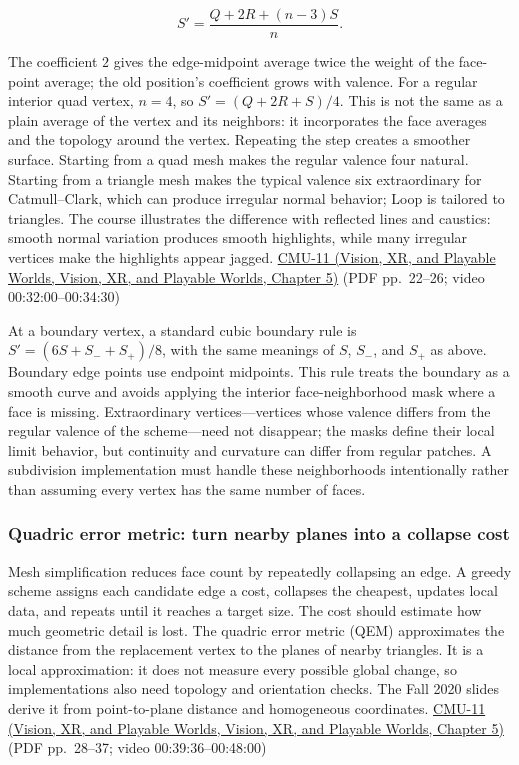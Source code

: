 \[
S'=\frac{Q+2R+(n-3)S}{n}.
\]

The coefficient \(2\) gives the edge-midpoint average twice the weight of the face-point average; the old position's coefficient grows with valence. For a regular interior quad vertex, \(n=4\), so \(S'=(Q+2R+S)/4\). This is not the same as a plain average of the vertex and its neighbors: it incorporates the face averages and the topology around the vertex. Repeating the step creates a smoother surface. Starting from a quad mesh makes the regular valence four natural. Starting from a triangle mesh makes the typical valence six extraordinary for Catmull--Clark, which can produce irregular normal behavior; Loop is tailored to triangles. The course illustrates the difference with reflected lines and caustics: smooth normal variation produces smooth highlights, while many irregular vertices make the highlights appear jagged. \href{../07-Vision-XR-and-Playable-Worlds/main.pdf\#nameddest=04-visual-computing-ii-ch036-cmu-11---digital-geometry-processing}{CMU-11 (Vision, XR, and Playable Worlds, Vision, XR, and Playable Worlds, Chapter 5)} (PDF pp.~22--26; video 00:32:00--00:34:30)

At a boundary vertex, a standard cubic boundary rule is \(S'=(6S+S_-+S_+)/8\), with the same meanings of \(S\), \(S_-\), and \(S_+\) as above. Boundary edge points use endpoint midpoints. This rule treats the boundary as a smooth curve and avoids applying the interior face-neighborhood mask where a face is missing. Extraordinary vertices---vertices whose valence differs from the regular valence of the scheme---need not disappear; the masks define their local limit behavior, but continuity and curvature can differ from regular patches. A subdivision implementation must handle these neighborhoods intentionally rather than assuming every vertex has the same number of faces.

\subsubsection{Quadric error metric: turn nearby planes into a collapse cost}\label{03-visual-computing-i-ch002-quadric-error-metric-turn-nearby-planes-into-a-collapse-cost}

Mesh simplification reduces face count by repeatedly collapsing an edge. A greedy scheme assigns each candidate edge a cost, collapses the cheapest, updates local data, and repeats until it reaches a target size. The cost should estimate how much geometric detail is lost. The quadric error metric (QEM) approximates the distance from the replacement vertex to the planes of nearby triangles. It is a local approximation: it does not measure every possible global change, so implementations also need topology and orientation checks. The Fall 2020 slides derive it from point-to-plane distance and homogeneous coordinates. \href{../07-Vision-XR-and-Playable-Worlds/main.pdf\#nameddest=04-visual-computing-ii-ch036-cmu-11---digital-geometry-processing}{CMU-11 (Vision, XR, and Playable Worlds, Vision, XR, and Playable Worlds, Chapter 5)} (PDF pp.~28--37; video 00:39:36--00:48:00)


